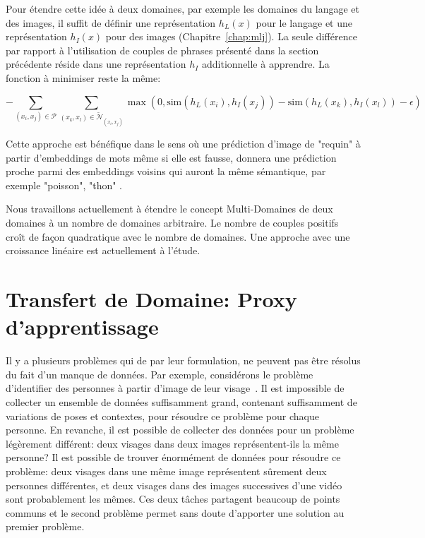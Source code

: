 Pour étendre cette idée à deux domaines, par exemple les domaines du langage et
des images, il suffit de définir une représentation $h_L(x)$ pour le langage et
une représentation $h_I(x)$ pour des images (Chapitre~\ref{chap:mlj}). La seule
différence par rapport à l'utilisation de couples de phrases présenté dans la
section précédente réside dans une représentation $h_I$ additionnelle à
apprendre. La fonction à minimiser reste la même:

 \begin{equation}
-\sum_{(x_i, x_j)\in\mathcal{P}}\sum_{(x_k, x_l)\in\tilde{\mathcal{N}}_{(x_i, x_j)}} \max (0, \textrm{sim}(h_L(x_i), h_I(x_j)) - \textrm{sim}(h_L(x_k), h_I(x_l)) - \epsilon)
\end{equation}

Cette approche est bénéfique dans le sens où une prédiction d'image de "requin"
à partir d'embeddings de mots même si elle est fausse, donnera une prédiction
proche parmi des embeddings voisins qui auront la même sémantique, par exemple
"poisson", "thon" \citep{samy-extreme}.

Nous travaillons actuellement à étendre le concept Multi-Domaines de deux
domaines à un nombre de domaines arbitraire. Le nombre de couples positifs
croît de façon quadratique avec le nombre de domaines. Une approche avec
une croissance linéaire est actuellement à l'étude.

\section{Transfert de Domaine: Proxy d'apprentissage}

Il y a plusieurs problèmes qui de par leur formulation, ne peuvent pas être
résolus du fait d'un manque de données. Par exemple, considérons le problème
d'identifier des personnes à partir d'image de leur visage~\citep{bottou-11}.
Il est impossible de collecter un ensemble de données suffisamment grand,
contenant suffisamment de variations de poses et contextes, pour résoudre ce
problème pour chaque personne. En revanche, il est possible de collecter des
données pour un problème légèrement différent: deux visages dans deux images
représentent-ils la même personne? Il est possible de trouver énormément de
données pour résoudre ce problème: deux visages dans une même image
représentent sûrement deux personnes différentes, et deux visages dans des
images successives d'une vidéo sont probablement les mêmes. Ces deux tâches
partagent beaucoup de points communs et le second problème permet sans doute
d'apporter une solution au premier problème. 
\\

